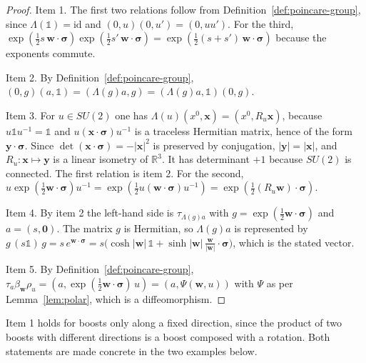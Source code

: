 	\begin{proof}
		Item 1. The first two relations follow from Definition~\ref{def:poincare-group}, since $\Lambda(\mathbb{1})=\mathrm{id}$ and $(0,u)(0,u')=(0,uu')$. For the third, $\exp(\tfrac12s\,\mathbf{w}\cdot\boldsymbol{\sigma})\exp(\tfrac12s'\,\mathbf{w}\cdot\boldsymbol{\sigma})=\exp(\tfrac12(s+s')\,\mathbf{w}\cdot\boldsymbol{\sigma})$ because the exponents commute.
		
		Item 2. By Definition~\ref{def:poincare-group}, $(0,g)(a,\mathbb{1})=(\Lambda(g)a,g)=(\Lambda(g)a,\mathbb{1})(0,g)$.
		
		Item 3. For $u\in SU(2)$ one has $\Lambda(u)(x^0,\mathbf{x})=(x^0,R_u\mathbf{x})$, because $u\mathbb{1}u^{-1}=\mathbb{1}$ and $u(\mathbf{x}\cdot\boldsymbol{\sigma})u^{-1}$ is a traceless Hermitian matrix, hence of the form $\mathbf{y}\cdot\boldsymbol{\sigma}$. Since $\det(\mathbf{x}\cdot\boldsymbol{\sigma})=-|\mathbf{x}|^2$ is preserved by conjugation, $|\mathbf{y}|=|\mathbf{x}|$, and $R_u:\mathbf{x}\mapsto\mathbf{y}$ is a linear isometry of $\mathbb{R}^3$. It has determinant $+1$ because $SU(2)$ is connected. The first relation is item 2. For the second, $u\exp(\tfrac12\mathbf{w}\cdot\boldsymbol{\sigma})u^{-1}=\exp(\tfrac12u(\mathbf{w}\cdot\boldsymbol{\sigma})u^{-1})=\exp(\tfrac12(R_u\mathbf{w})\cdot\boldsymbol{\sigma})$.
		
		Item 4. By item 2 the left-hand side is $\tau_{\Lambda(g)a}$ with $g=\exp(\tfrac12\mathbf{w}\cdot\boldsymbol{\sigma})$ and $a=(s,\mathbf{0})$. The matrix $g$ is Hermitian, so $\Lambda(g)a$ is represented by $g\,(s\mathbb{1})\,g=s\,e^{\mathbf{w}\cdot\boldsymbol{\sigma}}=s\big(\cosh|\mathbf{w}|\,\mathbb{1}+\sinh|\mathbf{w}|\,\tfrac{\mathbf{w}}{|\mathbf{w}|}\cdot\boldsymbol{\sigma}\big)$, which is the stated vector.
		
		Item 5. By Definition~\ref{def:poincare-group}, $\tau_a\beta_{\mathbf{w}}\rho_u=(a,\exp(\tfrac12\mathbf{w}\cdot\boldsymbol{\sigma})\,u)=(a,\Psi(\mathbf{w},u))$ with $\Psi$ as per Lemma~\ref{lem:polar}, which is a diffeomorphism.
	\end{proof}
	
	\noindent Item 1 holds for boosts only along a fixed direction, since the product of two boosts with different directions is a boost composed with a rotation. Both statements are made concrete in the two examples below.
	
